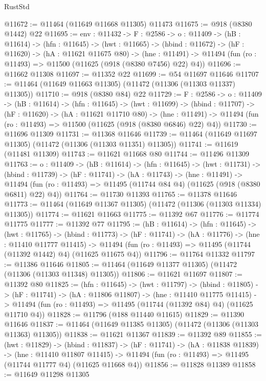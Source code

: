 \begin{lexlean}{RustStd}
\begin{coremodule}
@11672 := @11464 (@11649 @11668 @11305) @11473
@11675 := @918 (@8380 @1442) @22
@11695 := {env : @11432} ->
  {F : @2586} ->
  {o : @11409} ->
  (hB : @11614) ->
  (hfn : @11645) ->
  (hwt : @11665) ->
  (hbind : @11672) ->
  (hF : @11620) ->
  (hA : @11621 @11675 @80) ->
  (hne : @11491) -> @11494 (fun (ro : @11493) => @11500 (@11625 (@918 (@8380 @7456) @22) @4))
@11696 := @11662 @11308
@11697 := @11352 @22
@11699 := @54 @11697 @11646
@11707 := @11464 (@11649 @11663 @11305) (@11472 (@11306 (@11303 @11337) @11305))
@11710 := @918 (@8380 @84) @22
@11729 := {F : @2586} ->
  {o : @11409} ->
  (hB : @11614) ->
  (hfn : @11645) ->
  (hwt : @11699) ->
  (hbind : @11707) ->
  (hF : @11620) ->
  (hA : @11621 @11710 @80) ->
  (hne : @11491) -> @11494 (fun (ro : @11493) => @11500 (@11625 (@918 (@8380 @6846) @22) @4))
@11730 := @11696 @11309
@11731 := @11368 @11646
@11739 := @11464 (@11649 @11697 @11305) (@11472 (@11306 (@11303 @11351) @11305))
@11741 := @11619 (@11481 @11309)
@11743 := @11621 @11668 @80
@11744 := @11496 @11309
@11763 := {o : @11409} ->
  (hB : @11614) ->
  (hfn : @11645) ->
  (hwt : @11731) ->
  (hbind : @11739) ->
  (hF : @11741) ->
  (hA : @11743) ->
  (hne : @11491) ->
  @11494 (fun (ro : @11493) => @11495 (@11744 @84 @4) (@11625 (@918 (@8380 @6811) @22) @4))
@11764 := @11730 @11393
@11765 := @11378 @11646
@11773 := @11464 (@11649 @11367 @11305) (@11472 (@11306 (@11303 @11334) @11305))
@11774 := @11621 @11663
@11775 := @11392 @67
@11776 := @11774 @11775
@11777 := @11392 @77
@11795 := (hB : @11614) ->
  (hfn : @11645) ->
  (hwt : @11765) ->
  (hbind : @11773) ->
  (hF : @11741) ->
  (hA : @11776) ->
  (hne : @11410 @11777 @11415) ->
  @11494 (fun (ro : @11493) => @11495 (@11744 (@11392 @1442) @4) (@11625 @11675 @4))
@11796 := @11764 @11332
@11797 := @11386 @11646
@11805 := @11464 (@11649 @11377 @11305) (@11472 (@11306 (@11303 @11348) @11305))
@11806 := @11621 @11697
@11807 := @11392 @80
@11825 := (hfn : @11645) ->
  (hwt : @11797) ->
  (hbind : @11805) ->
  (hF : @11741) ->
  (hA : @11806 @11807) ->
  (hne : @11410 @11775 @11415) ->
  @11494 (fun (ro : @11493) => @11495 (@11744 (@11392 @84) @4) (@11625 @11710 @4))
@11828 := @11796 (@188 @11440 @11615)
@11829 := @11390 @11646
@11837 := @11464 (@11649 @11385 @11305) (@11472 (@11306 (@11303 @11363) @11305))
@11838 := @11621 @11367
@11839 := @11392 @89
@11855 := (hwt : @11829) ->
  (hbind : @11837) ->
  (hF : @11741) ->
  (hA : @11838 @11839) ->
  (hne : @11410 @11807 @11415) ->
  @11494 (fun (ro : @11493) => @11495 (@11744 @11777 @4) (@11625 @11668 @4))
@11856 := @11828 @11389
@11858 := @11649 @11298 @11305

\end{coremodule}
\end{lexlean}
